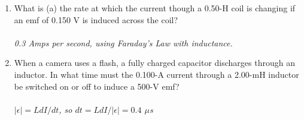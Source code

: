 \documentclass[10pt]{article}
\begin{document}
\begin{enumerate}
\item What is (a) the rate at which the current though a 0.50-H coil is changing if an emf of 0.150 V is induced across the coil? \\ \\
\textit{0.3 Amps per second, using Faraday's Law with inductance.}
\item When a camera uses a flash, a fully charged capacitor discharges through an inductor. In what time must the 0.100-A current through a 2.00-mH inductor be switched on or off to induce a 500-V emf? \\ \\
\textit{$|\epsilon| = L dI/dt$, so $dt = L dI/|\epsilon| = 0.4$ $\mu$s}
\end{enumerate}
\end{document}
